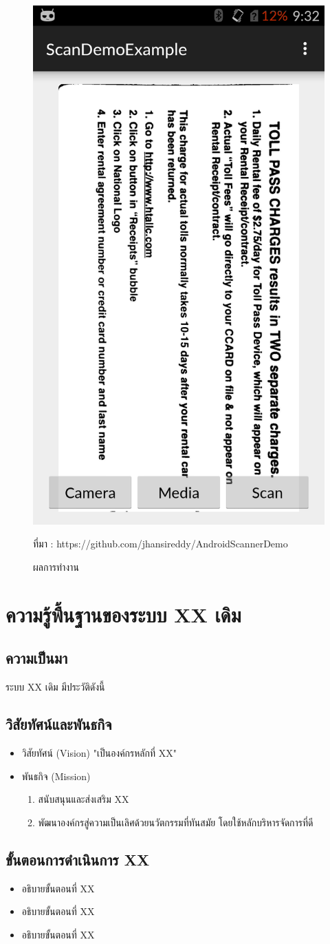 \begin{itemize}
\begin{figure}[H]
			     	\centering
			     	\includegraphics[width=0.3\columnwidth]{Figures/2/sc3}
			     	\caption{ผลการทำงาน}{ที่มา : https://github.com/jhansireddy/AndroidScannerDemo}
			     	\label{Fig:sc3}
			     \end{figure}
	     \end{itemize}
	     
	\section{ความรู้พื้นฐานของระบบ XX เดิม}
		 \subsection{ความเป็นมา}

      ระบบ XX เดิม มีประวัติดังนี้ 
		  
		  \subsection{วิสัยทัศน์และพันธกิจ}
		  \begin{itemize}
			  \item วิสัยทัศน์ (Vision)
			  "เป็นองค์กรหลักที่ XX"
			  
			  \item พันธกิจ (Mission)
			  \begin{enumerate}
			  	\item สนับสนุนและส่งเสริม XX 
			  	\item พัฒนาองค์กรสู่ความเป็นเลิศด้วยนวัตกรรมที่ทันสมัย โดยใช้หลักบริหารจัดการที่ดี
			  \end{enumerate}
		  \end{itemize}
	  
	  \subsection{ขั้นตอนการดำเนินการ XX}
	  \begin{itemize}
	  	\item อธิบายขั้นตอนที่ XX
	  	\item อธิบายขั้นตอนที่ XX
	  	\item อธิบายขั้นตอนที่ XX
	  \end{itemize}
	  

